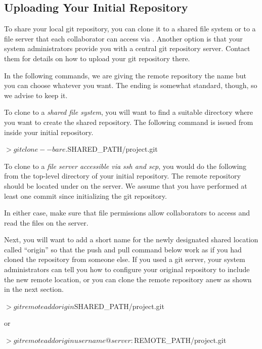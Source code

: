 \subsection{Uploading Your Initial Repository}\label{sec:upload-git}

To share your local git repository, you can clone it to a shared file system or to a file server that each collaborator can access via .  Another option is that your system administrators provide you with a central git repository server.  Contact them for details on how to upload your git repository there.

In the following commands, we are giving the remote repository the name  but you can choose whatever you want.  The ending  is somewhat standard, though, so we advise to keep it.  

To clone to a \textit{shared file system}, you will want to find a suitable directory  where you want to create the shared repository. The following command is issued from inside your initial repository.

\begin{CodeVerbatim}
$> git clone --bare . $SHARED_PATH/project.git
\end{CodeVerbatim}

To clone to a \textit{file server accessible via ssh and scp}, you would do the following from the top-level directory of your initial repository. The remote repository should be located under  on the server.  We assume that you have performed at least one commit since initializing the git repository.

In either case, make sure that file permissions allow collaborators to access and read the files on the server.

Next, you will want to add a short name for the newly designated shared location called ``origin'' so that the push and pull command below work as if you had cloned the repository from someone else.  If you used a git server, your system administrators can tell you how to configure your original repository to include the new remote location, or you can clone the remote repository anew as shown in the next section.
\begin{CodeVerbatim}
$> git remote add origin $SHARED_PATH/project.git
\end{CodeVerbatim}
or
\begin{CodeVerbatim}
$> git remote add origin username@server:$REMOTE_PATH/project.git
\end{CodeVerbatim}

